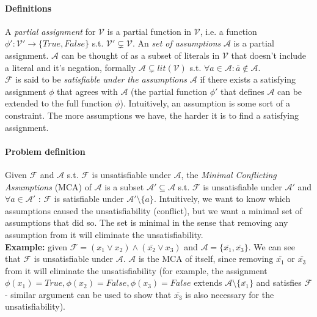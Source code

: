 \documentclass[]{article}
\begin{document}
\paragraph{Definitions} A \textit{partial assignment} for $ \mathcal{V} $ is a partial function in $ \mathcal{V} $, i.e. a function $ \phi' : \mathcal{V}' \rightarrow \{True, False\} $ s.t. $\mathcal{V}' \subsetneq \mathcal{V}$. An \textit{set of assumptions} $ \mathcal{A} $ is a partial assignment. $ \mathcal{A} $ can be thought of as a subset of literals in $\mathcal{V}$ that doesn't include a literal and it's negation, formally $ \mathcal{A} \subsetneq lit(\mathcal{V}) $ s.t. $ \forall a \in \mathcal{A} : \bar{a} \notin \mathcal{A} $.\\
$ \mathcal{F} $ is said to be \textit{satisfiable under the assumptions} $ \mathcal{A} $ if there exists a satisfying assignment $ \phi $ that agrees with $ \mathcal{A} $ (the partial function $ \phi' $ that defines $ \mathcal{A} $ can be extended to the full function $ \phi $). Intuitively, an assumption is some sort of a constraint. The more assumptions we have, the harder it is to find a satisfying assignment.
\paragraph{Problem definition} Given $ \mathcal{F} $ and $ \mathcal{A} $ s.t. $ \mathcal{F} $ is unsatisfiable under $ \mathcal{A} $, the \textit{Minimal Conflicting Assumptions} (MCA) of $ \mathcal{A} $ is a subset $ \mathcal{A}' \subseteq \mathcal{A} $ s.t. $ \mathcal{F} $ is unsatisfiable under $ \mathcal{A}' $ and $ \forall a \in \mathcal{A}' $ : $ \mathcal{F} $ is satisfiable under $ \mathcal{A}' \setminus \{a\} $. Intuitively, we want to know which assumptions caused the unsatisfiability (conflict), but we want a minimal set of assumptions that did so. The set is minimal in the sense that removing any assumption from it will eliminate the unsatisfiability.\\
\textbf{Example: } given  $\mathcal{F} = (x_1 \lor x_2) \land (\bar{x_2} \lor x_3)$ and $\mathcal{A} =\{\bar{x_1}, \bar{x_3}\}$. We can see that $ \mathcal{F} $ is unsatisfiable under $ \mathcal{A} $. $ \mathcal{A} $ is the MCA of itself, since removing $\bar{x_1}$ or $\bar{x_3}$ from it will eliminate the unsatisfiability (for example, the assignment $ \phi(x_1)=True,\phi(x_2)=False, \phi(x_3)=False $ extends $ \mathcal{A} \setminus \{\bar{x_1}\} $ and satisfies $\mathcal{F}$ - similar argument can be used to show that $\bar{x_3}$ is also necessary for the unsatisfiability).
\end{document}
